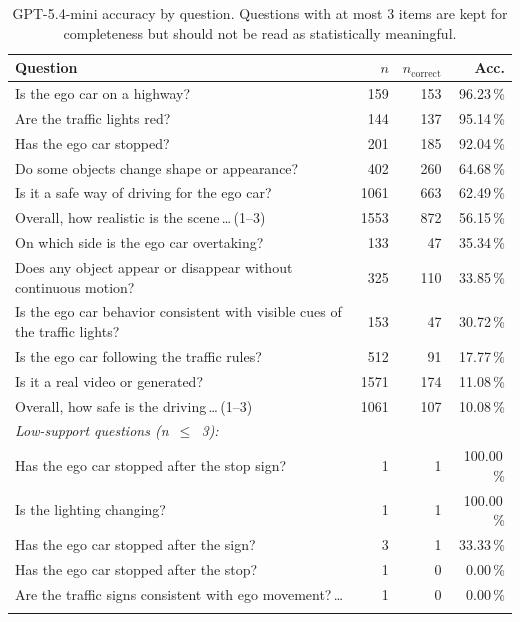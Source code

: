 \documentclass[11pt,a4paper]{article}
\newcommand{\pct}[1]{#1\,\%}
\begin{document}
{\small
\begin{longtable}{p{9.1cm}rrr}
\toprule
Question & $n$ & $n_\mathrm{correct}$ & Acc. \\
\midrule
Is the ego car on a highway?                                     & 159  & 153 & \pct{96.23} \\
Are the traffic lights red?                                      & 144  & 137 & \pct{95.14} \\
Has the ego car stopped?                                         & 201  & 185 & \pct{92.04} \\
Do some objects change shape or appearance?                      & 402  & 260 & \pct{64.68} \\
Is it a safe way of driving for the ego car?                     & 1061 & 663 & \pct{62.49} \\
Overall, how realistic is the scene\,\dots\,(1--3)               & 1553 & 872 & \pct{56.15} \\
On which side is the ego car overtaking?                         & 133  & 47  & \pct{35.34} \\
Does any object appear or disappear without continuous motion?   & 325  & 110 & \pct{33.85} \\
Is the ego car behavior consistent with visible cues of the traffic lights? & 153 & 47 & \pct{30.72} \\
Is the ego car following the traffic rules?                      & 512  & 91  & \pct{17.77} \\
Is it a real video or generated?                                 & 1571 & 174 & \pct{11.08} \\
Overall, how safe is the driving\,\dots\,(1--3)                  & 1061 & 107 & \pct{10.08} \\
\midrule
\multicolumn{4}{l}{\emph{Low-support questions (n~$\leq$~3):}} \\
Has the ego car stopped after the stop sign?                     & 1 & 1 & \pct{100.00} \\
Is the lighting changing?                                        & 1 & 1 & \pct{100.00} \\
Has the ego car stopped after the sign?                          & 3 & 1 & \pct{33.33} \\
Has the ego car stopped after the stop?                          & 1 & 0 & \pct{0.00} \\
Are the traffic signs consistent with ego movement?\,\dots       & 1 & 0 & \pct{0.00} \\
\bottomrule
\caption{GPT-5.4-mini accuracy by question. Questions with at most 3
items are kept for completeness but should not be read as
statistically meaningful.}
\label{tab:perq}
\end{longtable}
}
\end{document}
